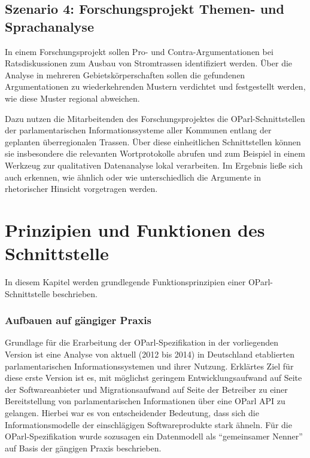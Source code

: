 \documentclass[,a4paper]{article}
\begin{document}
\subsection{Szenario 4: Forschungsprojekt Themen- und
Sprachanalyse}\label{szenarioux5fforschung}

In einem Forschungsprojekt sollen Pro- und Contra-Argumentationen bei
Ratsdiskussionen zum Ausbau von Stromtrassen identifiziert werden. Über
die Analyse in mehreren Gebietskörperschaften sollen die gefundenen
Argumentationen zu wiederkehrenden Mustern verdichtet und festgestellt
werden, wie diese Muster regional abweichen.

Dazu nutzen die Mitarbeitenden des Forschungsprojektes die
OParl-Schnittstellen der parlamentarischen Informationssysteme aller
Kommunen entlang der geplanten überregionalen Trassen. Über diese
einheitlichen Schnittstellen können sie insbesondere die relevanten
Wortprotokolle abrufen und zum Beispiel in einem Werkzeug zur
qualitativen Datenanalyse lokal verarbeiten. Im Ergebnis ließe sich auch
erkennen, wie ähnlich oder wie unterschiedlich die Argumente in
rhetorischer Hinsicht vorgetragen werden.

\section{Prinzipien und Funktionen des
Schnittstelle}\label{prinzipien-und-funktionen-des-schnittstelle}

In diesem Kapitel werden grundlegende Funktionsprinzipien einer
OParl-Schnittstelle beschrieben.


\subsubsection{Aufbauen auf gängiger
Praxis}\label{aufbauen-auf-guxe4ngiger-praxis}

Grundlage für die Erarbeitung der OParl-Spezifikation in der
vorliegenden Version ist eine Analyse von aktuell (2012 bis 2014) in
Deutschland etablierten parlamentarischen Informationssystemen und ihrer
Nutzung. Erklärtes Ziel für diese erste Version ist es, mit möglichst
geringem Entwicklungsaufwand auf Seite der Softwareanbieter und
Migrationsaufwand auf Seite der Betreiber zu einer Bereitstellung von
parlamentarischen Informationen über eine OParl API zu gelangen. Hierbei
war es von entscheidender Bedeutung, dass sich die Informationsmodelle
der einschlägigen Softwareprodukte stark ähneln. Für die
OParl-Spezifikation wurde sozusagen ein Datenmodell als ``gemeinsamer
Nenner'' auf Basis der gängigen Praxis beschrieben.
\end{document}
